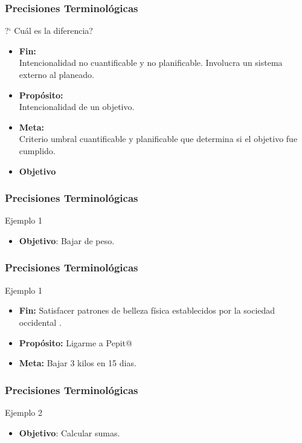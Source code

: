 \documentclass{beamer}
\begin{document}
\begin{frame}
\frametitle{Precisiones Terminol\'ogicas}
\begin{block}{?` Cu\'al es la diferencia? }
\begin{itemize}
\item \textbf{Fin:}\\ Intencionalidad no cuantificable y no planificable. Involucra  un sistema externo al planeado. 
\item \textbf{Prop\'osito:} \\Intencionalidad de un objetivo. 
\item \textbf{Meta:} \\Criterio umbral cuantificable y planificable que determina si el objetivo fue cumplido. 
\item \textbf{Objetivo}
\end{itemize}
\end{block}
\end{frame}


\begin{frame}
\frametitle{Precisiones Terminol\'ogicas}
\begin{block}{Ejemplo 1 }
\begin{itemize}
\item \textbf{Objetivo}: Bajar de peso.
\end{itemize}
\end{block}
\end{frame}
\begin{frame}
\frametitle{Precisiones Terminol\'ogicas}
\begin{block}{Ejemplo 1 }
\begin{itemize}
\item \textbf{Fin:} Satisfacer patrones de belleza f\'isica establecidos por la sociedad occidental .
\item \textbf{Prop\'osito:} Ligarme a Pepit@
\item \textbf{Meta:} Bajar 3 kilos en 15 dias. 
\end{itemize}
\end{block}
\end{frame}
\begin{frame}
\frametitle{Precisiones Terminol\'ogicas}
\begin{block}{Ejemplo 2 }
\begin{itemize}
\item \textbf{Objetivo}: Calcular sumas.
\end{itemize}
\end{block}
\end{frame}
\end{document}
